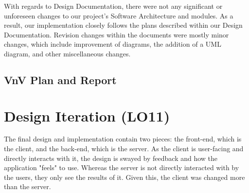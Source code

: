 \documentclass{article}
\begin{document}
With regards to Design Documentation, there were not any significant or unforeseen changes to our project's Software Architecture and modules. As a result, our implementation closely follows the plans described within our Design Documentation. Revision changes within the documents were mostly minor changes, which include improvement of diagrams, the addition of a UML diagram, and other miscellaneous changes.

\subsection{VnV Plan and Report}

\section{Design Iteration (LO11)}

\noindent The final design and implementation contain two pieces: the front-end, which is the client, and the back-end, which is the server. As the client is user-facing and directly interacts with it, the design is swayed by feedback and how the application "feels" to use. Whereas the server is not directly interacted with by the users, they only see the results of it. Given this, the client was changed more than the server.
\end{document}
